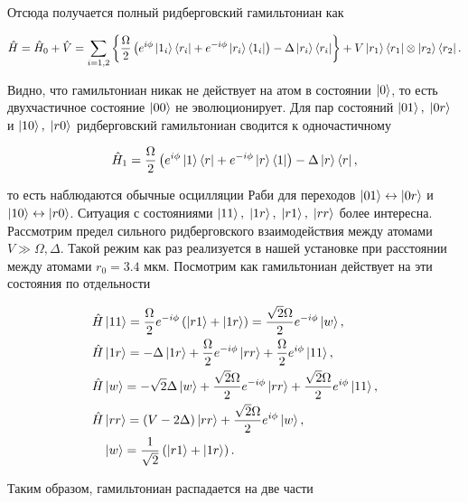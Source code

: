 Отсюда получается полный ридберговский гамильтониан как 

\begin{equation}
	\hat{H} = \hat{H}_0 + \hat{V} = \sum_{i=1,2}\left\{ \frac{\Omega}{2}\left(e^{i\phi}\left| 1_i \right\rangle\left\langle r_i \right| + e^{-i\phi}\left| r_i \right\rangle\left\langle 1_i \right|\right)-\Delta \left| r_i \right\rangle\left\langle r_i \right|\right\} + V \left| r_1 \right\rangle\left\langle r_1 \right|\otimes \left| r_2 \right\rangle\left\langle r_2 \right|.
\end{equation}

Видно, что гамильтониан никак не действует на атом в состоянии $\left| 0 \right\rangle$, то есть двухчастичное состояние $\left| 00 \right\rangle$ не эволюционирует. Для пар состояний $\left| 01 \right\rangle, \; \left| 0r \right\rangle$ и $\left| 10 \right\rangle, \; \left| r0 \right\rangle$ ридберговский гамильтониан сводится к одночастичному 

\begin{equation}
	\hat{H}_{1} = \frac{\Omega}{2}\left(e^{i\phi}\left| 1 \right\rangle\left\langle r \right| + e^{-i\phi}\left| r \right\rangle\left\langle 1 \right|\right)-\Delta \left| r \right\rangle\left\langle r \right|, 
\end{equation}

то есть наблюдаются обычные осцилляции Раби для переходов $\left| 01 \right\rangle \leftrightarrow \left| 0r \right\rangle$ и $\left| 10 \right\rangle\leftrightarrow \left| r0 \right\rangle$. Ситуация с состояниями $\left| 11 \right\rangle, \; \left| 1r \right\rangle, \; \left| r1 \right\rangle, \;\left| rr \right\rangle$ более интересна. Рассмотрим предел сильного ридберговского взаимодействия между атомами $V \gg \Omega, \Delta$. Такой режим как раз реализуется в нашей установке при расстоянии между атомами $r_0 = 3.4 \text{ мкм}$. Посмотрим как гамильтониан действует на эти состояния по отдельности 


\begin{equation}
	\begin{aligned}
		\hat{H} & \left| 11 \right\rangle = \frac{\Omega}{2}e^{-i\phi}\left(\left| r1 \right\rangle + \left| 1r \right\rangle\right) = \frac{\sqrt{2}\Omega}{2}e^{-i\phi}\left| w \right\rangle,\\
		\hat{H} & \left| 1r \right\rangle = -\Delta \left| 1r \right\rangle + \frac{\Omega}{2}e^{-i\phi}\left| rr \right\rangle + \frac{\Omega}{2}e^{i\phi}\left| 11 \right\rangle, \\
		\hat{H} & \left| w \right\rangle = -\sqrt{2}\Delta \left| w \right\rangle + \frac{\sqrt{2}\Omega}{2}e^{-i\phi}\left| rr \right\rangle + \frac{\sqrt{2}\Omega}{2}e^{i\phi}\left| 11 \right\rangle   ,\\
		\hat{H} & \left| rr \right\rangle = (V-2\Delta)\left| rr \right\rangle + \frac{\sqrt{2}\Omega}{2}e^{i\phi}\left| w \right\rangle, \\
		& \left| w \right\rangle = \frac{1}{\sqrt{2}}\left(\left| r1 \right\rangle + \left| 1r \right\rangle\right).
	\end{aligned}
\end{equation}

Таким образом, гамильтониан распадается на две части


